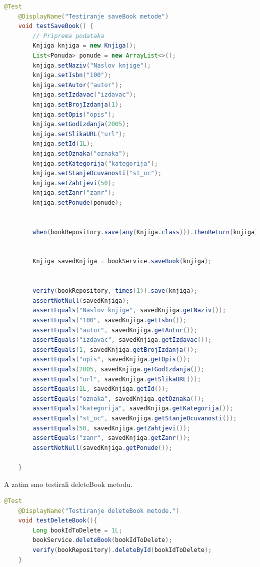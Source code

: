            \begin{lstlisting}[language=Java, label=lst:java_example, basicstyle=\scriptsize]
 @Test
    @DisplayName("Testiranje saveBook metode")
    void testSaveBook() {
        // Priprema podataka
        Knjiga knjiga = new Knjiga();
        List<Ponuda> ponude = new ArrayList<>();
        knjiga.setNaziv("Naslov knjige");
        knjiga.setIsbn("100");
        knjiga.setAutor("autor");
        knjiga.setIzdavac("izdavac");
        knjiga.setBrojIzdanja(1);
        knjiga.setOpis("opis");
        knjiga.setGodIzdanja(2005);
        knjiga.setSlikaURL("url");
        knjiga.setId(1L);
        knjiga.setOznaka("oznaka");
        knjiga.setKategorija("kategorija");
        knjiga.setStanjeOcuvanosti("st_oc");
        knjiga.setZahtjevi(50);
        knjiga.setZanr("zanr");
        knjiga.setPonude(ponude);


        when(bookRepository.save(any(Knjiga.class))).thenReturn(knjiga);


        Knjiga savedKnjiga = bookService.saveBook(knjiga);


        verify(bookRepository, times(1)).save(knjiga);
        assertNotNull(savedKnjiga);
        assertEquals("Naslov knjige", savedKnjiga.getNaziv());
        assertEquals("100", savedKnjiga.getIsbn());
        assertEquals("autor", savedKnjiga.getAutor());
        assertEquals("izdavac", savedKnjiga.getIzdavac());
        assertEquals(1, savedKnjiga.getBrojIzdanja());
        assertEquals("opis", savedKnjiga.getOpis());
        assertEquals(2005, savedKnjiga.getGodIzdanja());
        assertEquals("url", savedKnjiga.getSlikaURL());
        assertEquals(1L, savedKnjiga.getId());
        assertEquals("oznaka", savedKnjiga.getOznaka());
        assertEquals("kategorija", savedKnjiga.getKategorija());
        assertEquals("st_oc", savedKnjiga.getStanjeOcuvanosti());
        assertEquals(50, savedKnjiga.getZahtjevi());
        assertEquals("zanr", savedKnjiga.getZanr());
        assertNotNull(savedKnjiga.getPonude());

    }
			\end{lstlisting}

   
			A zatim smo testirali deleteBook metodu. 
                  \begin{lstlisting}[language=Java, label=2st:java_example, basicstyle=\scriptsize]
 @Test
    @DisplayName("Testiranje deleteBook metode.")
    void testDeleteBook(){
        Long bookIdToDelete = 1L;
        bookService.deleteBook(bookIdToDelete);
        verify(bookRepository).deleteById(bookIdToDelete);
    }
    
				\end{lstlisting}

